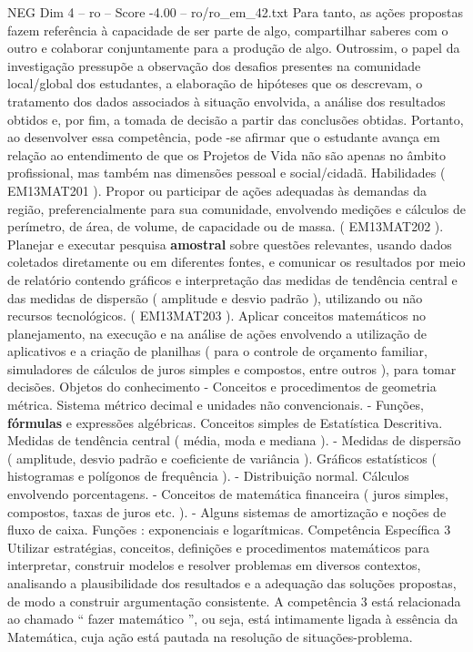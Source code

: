 \begin{textsample}{NEG Dim 4 – ro – Score -4.00 – ro/ro\_em\_42.txt}
Para tanto, as ações propostas fazem referência à capacidade de ser parte de algo, compartilhar saberes com o outro e colaborar conjuntamente para a produção de algo.
Outrossim, o papel da investigação pressupõe a observação dos desafios presentes na comunidade local/global dos estudantes, a elaboração de hipóteses que os descrevam, o tratamento dos dados associados à situação envolvida, a análise dos resultados obtidos e, por fim, a tomada de decisão a partir das conclusões obtidas.
Portanto, ao desenvolver essa competência, pode -se afirmar que o estudante avança em relação ao entendimento de que os Projetos de Vida não são apenas no âmbito profissional, mas também nas dimensões pessoal e social/cidadã.
Habilidades ( EM13MAT201 ).
Propor ou participar de ações adequadas às demandas da região, preferencialmente para sua comunidade, envolvendo medições e cálculos de perímetro, de área, de volume, de capacidade ou de massa. ( EM13MAT202 ).
Planejar e executar pesquisa \textbf{amostral} sobre questões relevantes, usando dados coletados diretamente ou em diferentes fontes, e comunicar os resultados por meio de relatório contendo gráficos e interpretação das medidas de tendência central e das medidas de dispersão ( amplitude e desvio padrão ), utilizando ou não recursos tecnológicos. ( EM13MAT203 ).
Aplicar conceitos matemáticos no planejamento, na execução e na análise de ações envolvendo a utilização de aplicativos e a criação de planilhas ( para o controle de orçamento familiar, simuladores de cálculos de juros simples e compostos, entre outros ), para tomar decisões.
Objetos do conhecimento - Conceitos e procedimentos de geometria métrica.
Sistema métrico decimal e unidades não convencionais. - Funções, \textbf{fórmulas} e expressões algébricas.
Conceitos simples de Estatística Descritiva.
Medidas de tendência central ( média, moda e mediana ). - Medidas de dispersão ( amplitude, desvio padrão e coeficiente de variância ).
Gráficos estatísticos ( histogramas e polígonos de frequência ). - Distribuição normal.
Cálculos envolvendo porcentagens. - Conceitos de matemática financeira ( juros simples, compostos, taxas de juros etc. ). - Alguns sistemas de amortização e noções de fluxo de caixa.
Funções : exponenciais e logarítmicas.
Competência Específica 3 Utilizar estratégias, conceitos, definições e procedimentos matemáticos para interpretar, construir modelos e resolver problemas em diversos contextos, analisando a plausibilidade dos resultados e a adequação das soluções propostas, de modo a construir argumentação consistente.
A competência 3 está relacionada ao chamado “ fazer matemático ”, ou seja, está intimamente ligada à essência da Matemática, cuja ação está pautada na resolução de situações-problema.

\end{textsample}
